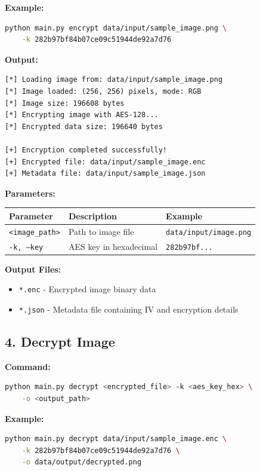 \documentclass[12pt,a4paper]{report}
\begin{document}
\textbf{Example:}
\begin{lstlisting}[language=bash]
python main.py encrypt data/input/sample_image.png \
    -k 282b97bf84b07ce09c51944de92a7d76
\end{lstlisting}

\textbf{Output:}
\begin{lstlisting}
[*] Loading image from: data/input/sample_image.png
[*] Image loaded: (256, 256) pixels, mode: RGB
[*] Image size: 196608 bytes
[*] Encrypting image with AES-128...
[*] Encrypted data size: 196640 bytes

[+] Encryption completed successfully!
[+] Encrypted file: data/input/sample_image.enc
[+] Metadata file: data/input/sample_image.json
\end{lstlisting}

\textbf{Parameters:}
\begin{table}[H]
    \centering
    \begin{tabular}{|l|l|l|}
    \hline
    \textbf{Parameter} & \textbf{Description} & \textbf{Example} \\
    \hline
    \texttt{<image\_path>} & Path to image file & \texttt{data/input/image.png} \\
    \texttt{-k, --key} & AES key in hexadecimal & \texttt{282b97bf...} \\
    \hline
    \end{tabular}
\end{table}

\textbf{Output Files:}
\begin{itemize}
    \item \texttt{*.enc} - Encrypted image binary data
    \item \texttt{*.json} - Metadata file containing IV and encryption details
\end{itemize}

\subsection{4. Decrypt Image}

\textbf{Command:}
\begin{lstlisting}[language=bash]
python main.py decrypt <encrypted_file> -k <aes_key_hex> \
    -o <output_path>
\end{lstlisting}

\textbf{Example:}
\begin{lstlisting}[language=bash]
python main.py decrypt data/input/sample_image.enc \
    -k 282b97bf84b07ce09c51944de92a7d76 \
    -o data/output/decrypted.png
\end{lstlisting}
\end{document}
